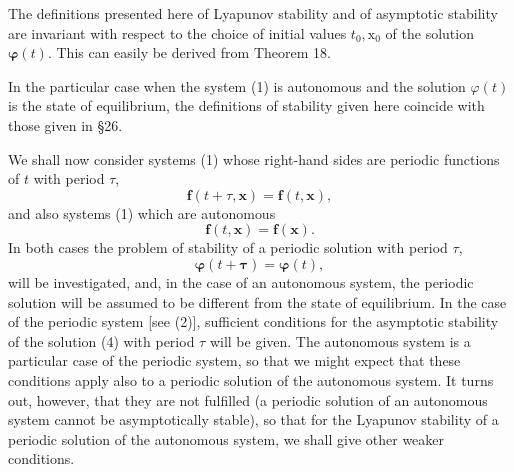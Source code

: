 \documentclass[10pt,a5paper]{book}
\theoremstyle{plain}
\theoremstyle{definition}
\theoremstyle{remark}
\begin{document}
The definitions presented here of Lyapunov stability and of asymptotic stability are invariant with respect to the choice of initial values $t_{0}, \mathrm{x}_{0}$ of the solution $\boldsymbol{\varphi}(t)$. This can easily be derived from Theorem 18.

In the particular case when the system (1) is autonomous and the solution $\varphi(t)$ is the state of equilibrium, the definitions of stability given here coincide with those given in §26.

We shall now consider systems (1) whose right-hand sides are periodic functions of $t$ with period $\tau$,
\begin{equation*}
\mathbf{f}(t+\tau, \mathbf{x})=\mathbf{f}(t, \mathbf{x}), \tag{2}
\end{equation*}
and also systems (1) which are autonomous
\begin{equation*}
\mathbf{f}(t, \mathbf{x})=\mathbf{f}(\mathbf{x}) . \tag{3}
\end{equation*}
In both cases the problem of stability of a periodic solution with period $\tau$,
\begin{equation*}
\boldsymbol{\varphi}(t+\boldsymbol{\tau})=\boldsymbol{\varphi}(t), \tag{4}
\end{equation*}
will be investigated, and, in the case of an autonomous system, the periodic solution will be assumed to be different from the state of equilibrium. In the case of the periodic system [see (2)], sufficient conditions for the asymptotic stability of the solution (4) with period $\tau$ will be given. The autonomous system is a particular case of the periodic system, so that we might expect that these conditions apply also to a periodic solution of the autonomous system. It turns out, however, that they are not fulfilled (a periodic solution of an autonomous system cannot be asymptotically stable), so that for the Lyapunov stability of a periodic solution of the autonomous system, we shall give other weaker conditions.
\end{document}
